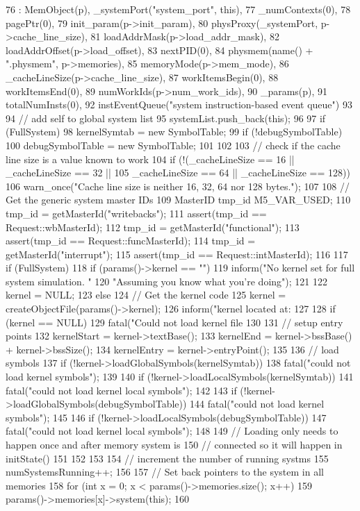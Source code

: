 \begin{DoxyCode}
76     : MemObject(p), _systemPort("system_port", this),
77       _numContexts(0),
78       pagePtr(0),
79       init_param(p->init_param),
80       physProxy(_systemPort, p->cache_line_size),
81       loadAddrMask(p->load_addr_mask),
82       loadAddrOffset(p->load_offset),
83       nextPID(0),
84       physmem(name() + ".physmem", p->memories),
85       memoryMode(p->mem_mode),
86       _cacheLineSize(p->cache_line_size),
87       workItemsBegin(0),
88       workItemsEnd(0),
89       numWorkIds(p->num_work_ids),
90       _params(p),
91       totalNumInsts(0),
92       instEventQueue("system instruction-based event queue")
93 {
94     // add self to global system list
95     systemList.push_back(this);
96 
97     if (FullSystem) {
98         kernelSymtab = new SymbolTable;
99         if (!debugSymbolTable)
100             debugSymbolTable = new SymbolTable;
101     }
102 
103     // check if the cache line size is a value known to work
104     if (!(_cacheLineSize == 16 || _cacheLineSize == 32 ||
105           _cacheLineSize == 64 || _cacheLineSize == 128))
106         warn_once("Cache line size is neither 16, 32, 64 nor 128 bytes.\n");
107 
108     // Get the generic system master IDs
109     MasterID tmp_id M5_VAR_USED;
110     tmp_id = getMasterId("writebacks");
111     assert(tmp_id == Request::wbMasterId);
112     tmp_id = getMasterId("functional");
113     assert(tmp_id == Request::funcMasterId);
114     tmp_id = getMasterId("interrupt");
115     assert(tmp_id == Request::intMasterId);
116 
117     if (FullSystem) {
118         if (params()->kernel == "") {
119             inform("No kernel set for full system simulation. "
120                    "Assuming you know what you're doing\n");
121 
122             kernel = NULL;
123         } else {
124             // Get the kernel code
125             kernel = createObjectFile(params()->kernel);
126             inform("kernel located at: %
127 
128             if (kernel == NULL)
129                 fatal("Could not load kernel file %
130 
131             // setup entry points
132             kernelStart = kernel->textBase();
133             kernelEnd = kernel->bssBase() + kernel->bssSize();
134             kernelEntry = kernel->entryPoint();
135 
136             // load symbols
137             if (!kernel->loadGlobalSymbols(kernelSymtab))
138                 fatal("could not load kernel symbols\n");
139 
140             if (!kernel->loadLocalSymbols(kernelSymtab))
141                 fatal("could not load kernel local symbols\n");
142 
143             if (!kernel->loadGlobalSymbols(debugSymbolTable))
144                 fatal("could not load kernel symbols\n");
145 
146             if (!kernel->loadLocalSymbols(debugSymbolTable))
147                 fatal("could not load kernel local symbols\n");
148 
149             // Loading only needs to happen once and after memory system is
150             // connected so it will happen in initState()
151         }
152     }
153 
154     // increment the number of running systms
155     numSystemsRunning++;
156 
157     // Set back pointers to the system in all memories
158     for (int x = 0; x < params()->memories.size(); x++)
159         params()->memories[x]->system(this);
160 }
\end{DoxyCode}
